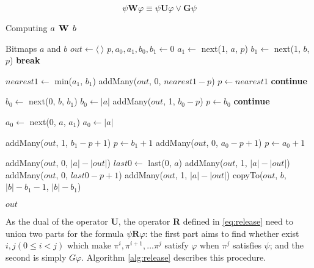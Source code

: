 \begin{equation} \label{eq:uw}
\psi \textbf{W} \varphi \equiv \psi \textbf{U} \varphi \vee \textbf{G}\psi
\end{equation}

\begin{algorithm}
\caption{Computing $a \mathrel{\mbox{\,\textbf{W}}}\, b$}
\label{alg:wuntil}
\begin{multicols}{2}
\begin{algorithmic}[1]
\Require Bitmaps $a$ and $b$
\State $out \gets \langle~\rangle$
\State $p, a_0, a_1, b_0, b_1 \gets 0$
    \State $a_1 \gets$ next(1, $a$, $p$)
  \EndIf
    \State $b_1 \gets$ next(1, $b$, $p$)
  \EndIf
    \State \textbf{break}
  \EndIf

  \State $nearest1 \gets$ min($a_1$, $b_1$)
    \State addMany($out$, 0, $nearest1 - p$)
    \State $p \gets nearest1$
    \State \textbf{continue}
  \EndIf

      \State $b_0 \gets$ next(0, $b$, $b_1$)
        \State $b_0 \gets |a|$
      \EndIf
    \EndIf
    \State addMany($out$, 1, $b_0 - p$)
    \State $p \gets b_0$
    \State \textbf{continue}
  \EndIf

    \State  $a_0 \gets$ next(0, $a$, $a_1$)
      \State $a_0 \gets |a|$
    \EndIf
  \EndIf

    \State addMany($out$, 1, $b_1 - p + 1$)
    \State $p \gets b_1 + 1$
  \Else
    \State addMany($out$, 0, $a_0 - p + 1$)
    \State $p \gets a_0 + 1$
  \EndIf
\EndWhile

    \State addMany($out$, 0, $|a| - |out|$)
  \Else
    \State $last0 \gets$ last(0, $a$)
      \State addMany($out$, 1, $|a| - |out|$)
    \Else
      \State addMany($out$, 0, $last0 - p + 1$)
      \State addMany($out$, 1, $|a| - |out|$)
    \EndIf
  \EndIf
{}
  \State copyTo($out$, $b$, $|b| - b_1 - 1$, $|b| - b_1$)
\EndIf

\State \Return $out$
\end{algorithmic}
\end{multicols}
\end{algorithm}

As the dual of the operator \textbf{U}, the operator \textbf{R} defined in \eqref{eq:release} need to union two parts for the formula $\psi \textbf{R} \varphi$: the first part aims to find whether exist $i, j (0 \leq i < j)$ which make $\pi^i, \pi^{i + 1}, ... \pi^j$ satisfy $\varphi$ when $\pi^j$ satisfies $\psi$; and the second is simply $G\varphi$. Algorithm \ref{alg:release} describes this procedure.


